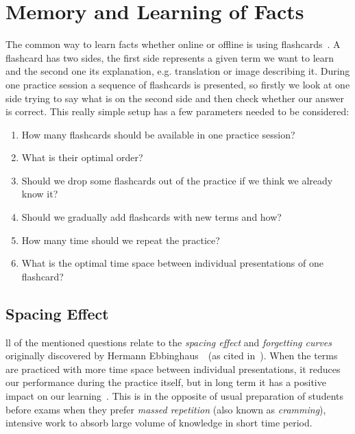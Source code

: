 \documentclass[table,color]{fithesis3/fithesis3}
\begin{document}
\section{Memory and Learning of Facts}
\label{section:models}

The common way to learn facts whether online or offline is using
flashcards~\cite{kornell2008optimising}. A flashcard has two sides, the first
side represents a given term we want to learn and the second one its
explanation, e.g. translation or image describing it.  During one practice
session a sequence of flashcards is presented, so firstly we look at one side
trying to say what is on the second side and then check whether our answer is
correct. This really simple setup has a few parameters needed to be considered:

\begin{enumerate}
	\item How many flashcards should be available in one practice session?
	\item What is their optimal order?
	\item Should we drop some flashcards out of the practice if we think we already know it?
	\item Should we gradually add flashcards with new terms and how?
	\item How many time should we repeat the practice?
	\item What is the optimal time space between individual presentations of one flashcard?
\end{enumerate}

\subsection{Spacing Effect}
\label{section:spacing_effect}
ll of the mentioned questions relate to the \emph{spacing
effect} and \emph{forgetting curves} originally discovered by Hermann
Ebbinghaus~\cite{ebbinghaus1885spacing}~(as cited
in~\cite{pavlik2005practice}). When the terms are practiced with more time
space between individual presentations, it reduces our performance during the
practice itself, but in long term it has a positive impact on our
learning~\cite{maass2015how, kornell2009optimising}. This is in the opposite of
usual preparation of students before exams when they prefer \emph{massed
repetition} (also known as \emph{cramming}), intensive work to absorb large
volume of knowledge in short time period.
\end{document}
